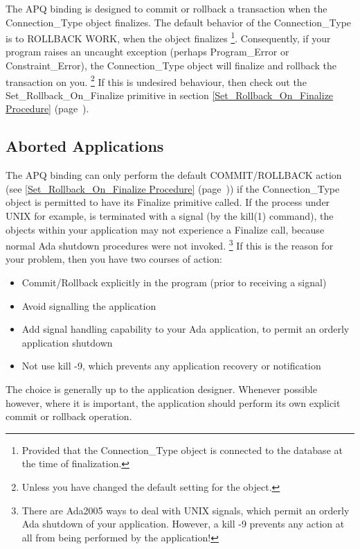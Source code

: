 \documentclass[english,letterpaper]{book}
\newcommand\Ref[1]{\textsection\ref{#1} (page~\pageref{#1})}
\begin{document}
The APQ binding is designed to commit or rollback a transaction when the
Connection\_Type object finalizes. The default behavior of the
Connection\_Type is to ROLLBACK WORK, when the object finalizes%
\footnote{Provided that the Connection\_Type object is connected to the
database at the time of finalization.}. Consequently, if your program
raises an uncaught exception (perhaps Program\_Error or
Constraint\_Error), the Connection\_Type object will finalize and
rollback the transaction on you. \footnote{Unless you have changed the
default setting for the object. } If this is undesired behaviour, then
check out the Set\_Rollback\_On\_Finalize primitive in section
\Ref{Set_Rollback_On_Finalize Procedure}.


\subsection{Aborted Applications}

The APQ binding can only perform the default COMMIT/ROLLBACK action
(see \Ref{Set_Rollback_On_Finalize Procedure}) if the Connection\_Type
object is permitted to have its Finalize primitive called. If the
process under UNIX for example, is terminated with a signal (by the
kill(1) command), the objects within your application may not experience
a Finalize call, because normal Ada shutdown procedures were not invoked.%
\footnote{There are Ada2005 ways to deal with UNIX signals, which permit an orderly
Ada shutdown of your application. However, a kill -9 prevents any
action at all from being performed by the application!%
} If this is the reason for your problem, then you have two courses
of action:

\begin{itemize}
   \item Commit/Rollback explicitly in the program (prior to receiving a signal)
   \item Avoid signalling the application
   \item Add signal handling capability to your Ada application, to permit
         an orderly application shutdown
   \item Not use kill -9, which prevents any application recovery or notification
\end{itemize}

The choice is generally up to the application designer. Whenever possible
however, where it is important, the application should perform its
own explicit commit or rollback operation.
\end{document}
